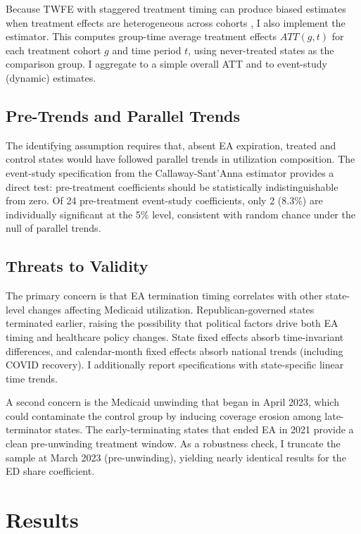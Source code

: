 \documentclass[12pt]{article}
\begin{document}
Because TWFE with staggered treatment timing can produce biased estimates when treatment effects are heterogeneous across cohorts \citep{goodman2021difference, sun2021estimating}, I also implement the \citet{callaway2021difference} estimator. This computes group-time average treatment effects $ATT(g,t)$ for each treatment cohort $g$ and time period $t$, using never-treated states as the comparison group. I aggregate to a simple overall ATT and to event-study (dynamic) estimates.

\subsection{Pre-Trends and Parallel Trends}

The identifying assumption requires that, absent EA expiration, treated and control states would have followed parallel trends in utilization composition. The event-study specification from the Callaway-Sant'Anna estimator provides a direct test: pre-treatment coefficients should be statistically indistinguishable from zero. Of 24 pre-treatment event-study coefficients, only 2 (8.3\%) are individually significant at the 5\% level, consistent with random chance under the null of parallel trends.

\subsection{Threats to Validity}

The primary concern is that EA termination timing correlates with other state-level changes affecting Medicaid utilization. Republican-governed states terminated earlier, raising the possibility that political factors drive both EA timing and healthcare policy changes. State fixed effects absorb time-invariant differences, and calendar-month fixed effects absorb national trends (including COVID recovery). I additionally report specifications with state-specific linear time trends.

A second concern is the Medicaid unwinding that began in April 2023, which could contaminate the control group by inducing coverage erosion among late-terminator states. The early-terminating states that ended EA in 2021 provide a clean pre-unwinding treatment window. As a robustness check, I truncate the sample at March 2023 (pre-unwinding), yielding nearly identical results for the ED share coefficient.

\section{Results}
\end{document}

